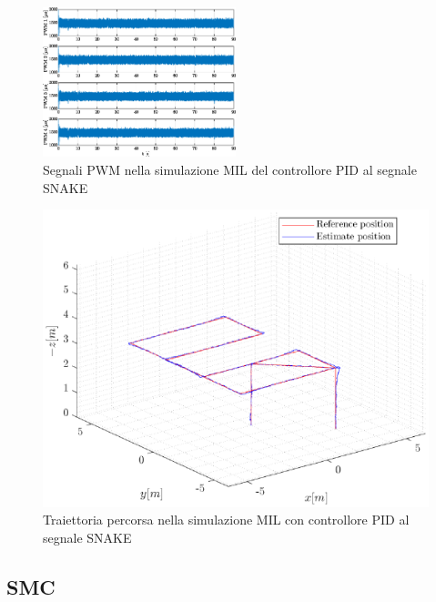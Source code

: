 \begin{figure}
	\centering
	\includegraphics[width=0.5\textwidth]{Simulazioni/Figure/PID/SNAKE_MIL/PWM}
	\caption{Segnali PWM nella simulazione MIL del controllore PID al segnale SNAKE}
\end{figure}
\begin{figure}
	\centering
	\includegraphics[width=1\textwidth]{Simulazioni/Figure/PID/SNAKE_MIL/Trajectory}
	\caption{Traiettoria percorsa nella simulazione MIL con controllore PID al segnale SNAKE}
\end{figure}

\clearpage
\subsection{SMC}
